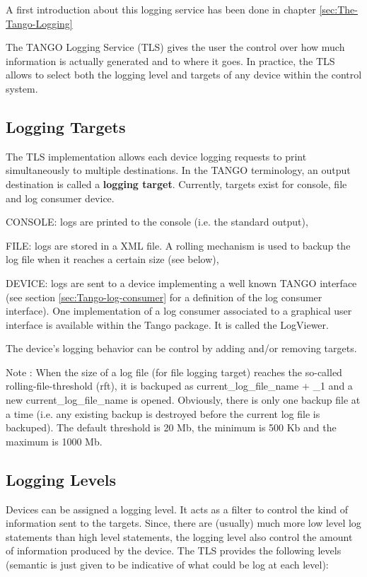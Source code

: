 A first introduction about this logging service has been done in chapter
\ref{sec:The-Tango-Logging}

The TANGO Logging Service (TLS) gives the user the control over how
much information is actually generated and to where it goes. In practice,
the TLS allows to select both the logging level and targets of any
device within the control system.


\subsection{Logging Targets}

The TLS implementation allows each device logging requests to print
simultaneously to multiple destinations. In the TANGO terminology,
an output destination is called a \textbf{logging target}. Currently,
targets exist for console, file and log consumer device. 

CONSOLE: logs are printed to the console (i.e. the standard output),

FILE: logs are stored in a XML file. A rolling mechanism is used to
backup the log file when it reaches a certain size (see below), 

DEVICE: logs are sent to a device implementing a well known TANGO
interface (see section \ref{sec:Tango-log-consumer} for a definition
of the log consumer interface). One implementation of a log consumer
associated to a graphical user interface is available within the Tango
package. It is called the LogViewer.

The device's logging behavior can be control by adding and/or removing
targets.

Note : When the size of a log file (for file logging target) reaches
the so-called rolling-file-threshold (rft), it is backuped as \textquotedbl{}current\_log\_file\_name\textquotedbl{}
+ \textquotedbl{}\_1\textquotedbl{} and a new \textquotedbl{}current\_log\_file\_name\textquotedbl{}
is opened. Obviously, there is only one backup file at a time (i.e.
any existing backup is destroyed before the current log file is backuped).
The default threshold is 20 Mb, the minimum is 500 Kb and the maximum
is 1000 Mb.


\subsection{Logging Levels}

Devices can be assigned a logging level. It acts as a filter to control
the kind of information sent to the targets. Since, there are (usually)
much more low level log statements than high level statements, the
logging level also control the amount of information produced by the
device. The TLS provides the following levels (semantic is just given
to be indicative of what could be log at each level):

